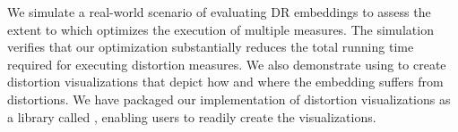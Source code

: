 We simulate a real-world scenario of evaluating DR embeddings to assess the extent to which \library optimizes the execution of multiple measures.
The simulation verifies that our optimization substantially reduces the total running time required for executing distortion measures. 
We also demonstrate using \library to create distortion visualizations that depict how and where the embedding suffers from distortions. We have packaged our implementation of distortion visualizations as a library called \vislib, enabling users to readily create the visualizations. 



















